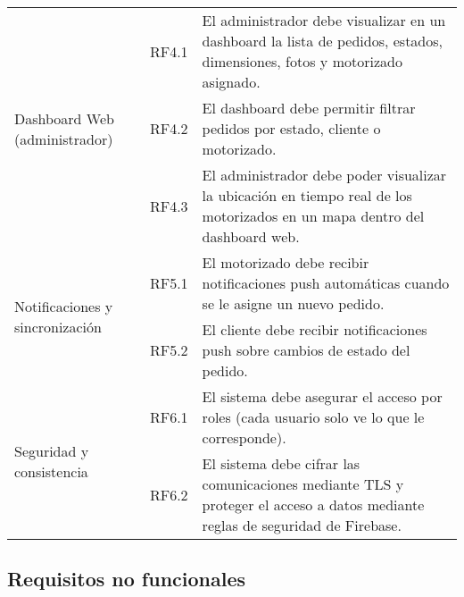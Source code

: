 \begin{longtable}{@{}p{3.5cm}p{1.5cm}p{10cm}@{}}
\multirow{3}{=}{Dashboard Web (administrador)} 
& RF4.1 & El administrador debe visualizar en un dashboard la lista de pedidos, estados, dimensiones, fotos y motorizado asignado. \\
& RF4.2 & El dashboard debe permitir filtrar pedidos por estado, cliente o motorizado. \\
& RF4.3 & El administrador debe poder visualizar la ubicación en tiempo real de los motorizados en un mapa dentro del dashboard web. \\ \midrule

\multirow{2}{=}{Notificaciones y sincronización} 
& RF5.1 & El motorizado debe recibir notificaciones push automáticas cuando se le asigne un nuevo pedido. \\
& RF5.2 & El cliente debe recibir notificaciones push sobre cambios de estado del pedido. \\ \midrule

\multirow{2}{=}{Seguridad y consistencia} 
& RF6.1 & El sistema debe asegurar el acceso por roles (cada usuario solo ve lo que le corresponde). \\
& RF6.2 & El sistema debe cifrar las comunicaciones mediante TLS y proteger el acceso a datos mediante reglas de seguridad de Firebase. \\

\end{longtable}

\subsection{Requisitos no funcionales}

